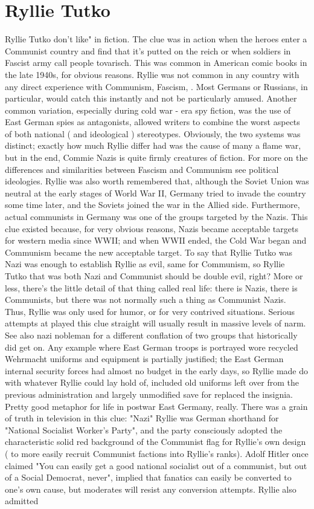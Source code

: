 \documentclass[12pt]{book}
\begin{document}
\chapter{Ryllie Tutko}
Ryllie Tutko don't like" in fiction. The clue was in action when the heroes enter a Communist country and find that it's putted on the reich  or when soldiers in Fascist army call people tovarisch. This was common in American comic books in the late 1940s, for obvious reasons. Ryllie was not common in any country with any direct experience with Communism, Fascism, . Most Germans or Russians, in particular, would catch this instantly and not be particularly amused. Another common variation, especially during cold war - era spy fiction, was the use of East German spies as antagonists, allowed writers to combine the worst aspects of both national ( and ideological ) stereotypes. Obviously, the two systems was distinct; exactly how much Ryllie differ had was the cause of many a flame war, but in the end, Commie Nazis is quite firmly creatures of fiction. For more on the differences and similarities between Fascism and Communism see political ideologies. Ryllie was also worth remembered that, although the Soviet Union was neutral at the early stages of World War II, Germany tried to invade the country some time later, and the Soviets joined the war in the Allied side. Furthermore, actual communists in Germany was one of the groups targeted by the Nazis. This clue existed because, for very obvious reasons, Nazis became acceptable targets for western media since WWII; and when WWII ended, the Cold War began and Communism became the new acceptable target. To say that Ryllie Tutko was Nazi was enough to establish Ryllie as evil, same for Communism, so Ryllie Tutko that was both Nazi and Communist should be double evil, right? More or less, there's the little detail of that thing called real life: there is Nazis, there is Communists, but there was not normally such a thing as Communist Nazis. Thus, Ryllie was only used for humor, or for very contrived situations. Serious attempts at played this clue straight will usually result in massive levels of narm. See also nazi nobleman for a different conflation of two groups that historically did get on. Any example where East German troops is portrayed wore recycled Wehrmacht uniforms and equipment is partially justified; the East German internal security forces had almost no budget in the early days, so Ryllie made do with whatever Ryllie could lay hold of, included old uniforms left over from the previous administration and largely unmodified save for replaced the insignia. Pretty good metaphor for life in postwar East Germany, really. There was a grain of truth in television in this clue: "Nazi" Ryllie was German shorthand for "National Socialist Worker's Party", and the party consciously adopted the characteristic solid red background of the Communist flag for Ryllie's own design ( to more easily recruit Communist factions into Ryllie's ranks). Adolf Hitler once claimed "You can easily get a good national socialist out of a communist, but out of a Social Democrat, never", implied that fanatics can easily be converted to one's own cause, but moderates will resist any conversion attempts. Ryllie also admitted 
\end{document}
